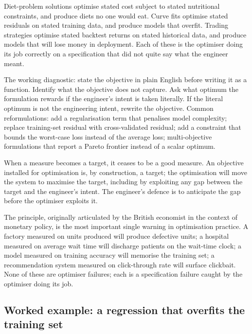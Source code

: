 Diet-problem solutions optimise stated cost subject to stated
nutritional constraints, and produce diets no one would eat.
Curve fits optimise stated residuals on stated training data, and
produce models that overfit. Trading strategies optimise stated
backtest returns on stated historical data, and produce models
that will lose money in deployment. Each of these is the
optimiser doing its job correctly on a specification that did not
quite say what the engineer meant.

The working diagnostic: state the objective in plain English
before writing it as a function. Identify what the objective does
not capture. Ask what optimum the formulation rewards if the
engineer's intent is taken literally. If the literal optimum is
not the engineering intent, rewrite the objective. Common
reformulations: add a regularisation term that penalises model
complexity; replace training-set residual with cross-validated
residual; add a constraint that bounds the worst-case loss
instead of the average loss; multi-objective formulations that
report a Pareto frontier instead of a scalar optimum.

\begin{principle}
When a measure becomes a target, it ceases to be a good measure.
An objective installed for optimisation is, by construction, a
target; the optimisation will move the system to maximise the
target, including by exploiting any gap between the target and
the engineer's intent. The engineer's defence is to anticipate
the gap before the optimiser exploits it.
\end{principle}

The principle, originally articulated by the British economist
\textcite{text:v2ch15-goodhart1975} in the context of monetary
policy, is the most important single warning in optimisation
practice. A
factory measured on units produced will produce defective units;
a hospital measured on average wait time will discharge patients
on the wait-time clock; a model measured on training accuracy
will memorise the training set; a recommendation system measured
on click-through rate will surface clickbait. None of these are
optimiser failures; each is a specification failure caught by
the optimiser doing its job.

\subsection{Worked example: a regression that overfits the
training set}

